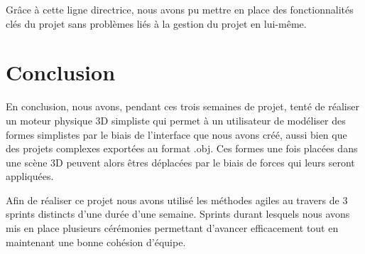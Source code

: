 \documentclass[11pt]{report}
\begin{document}
Grâce à cette ligne directrice, nous avons pu mettre en place des fonctionnalités clés du projet sans problèmes liés à la gestion du projet en lui-même.

\chapter{Conclusion}

En conclusion, nous avons, pendant ces trois semaines de projet, tenté de réaliser un moteur physique 3D simpliste qui permet à un utilisateur de modéliser des formes simplistes par le biais de l'interface que nous avons créé, aussi bien que des projets complexes exportées au format .obj. Ces formes une fois placées dans une scène 3D peuvent alors êtres déplacées par le biais de forces qui leurs seront appliquées.\newline

Afin de réaliser ce projet nous avons utilisé les méthodes agiles au travers de 3 sprints distincts d'une durée d'une semaine. Sprints durant lesquels nous avons mis en place plusieurs cérémonies permettant d'avancer efficacement tout en maintenant une bonne cohésion d'équipe.\newline
\end{document}
